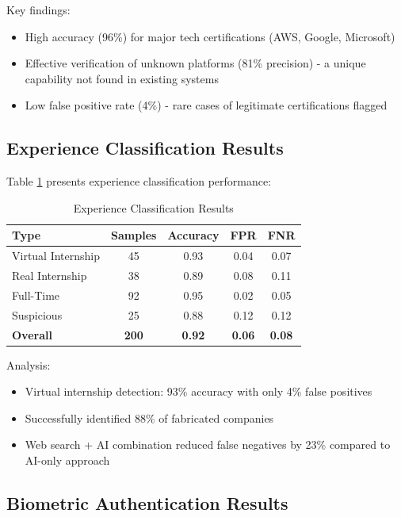 \documentclass[journal]{IEEEtran}
\begin{document}
Key findings:
\begin{itemize}
\item High accuracy (96\%) for major tech certifications (AWS, Google, Microsoft)
\item Effective verification of unknown platforms (81\% precision) - a unique capability not found in existing systems
\item Low false positive rate (4\%) - rare cases of legitimate certifications flagged
\end{itemize}

\subsection{Experience Classification Results}

Table \ref{tab:exp_results} presents experience classification performance:

\begin{table}[h]
\centering
\caption{Experience Classification Results}
\label{tab:exp_results}
\begin{tabular}{@{}lcccc@{}}
\toprule
\textbf{Type} & \textbf{Samples} & \textbf{Accuracy} & \textbf{FPR} & \textbf{FNR} \\
\midrule
Virtual Internship & 45 & 0.93 & 0.04 & 0.07 \\
Real Internship & 38 & 0.89 & 0.08 & 0.11 \\
Full-Time & 92 & 0.95 & 0.02 & 0.05 \\
Suspicious & 25 & 0.88 & 0.12 & 0.12 \\
\textbf{Overall} & \textbf{200} & \textbf{0.92} & \textbf{0.06} & \textbf{0.08} \\
\bottomrule
\end{tabular}
\end{table}

Analysis:
\begin{itemize}
\item Virtual internship detection: 93\% accuracy with only 4\% false positives
\item Successfully identified 88\% of fabricated companies
\item Web search + AI combination reduced false negatives by 23\% compared to AI-only approach
\end{itemize}

\subsection{Biometric Authentication Results}
\end{document}
